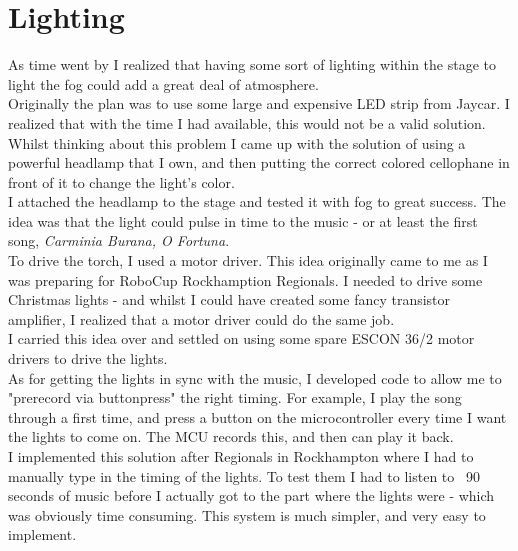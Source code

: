 		\chapter{Lighting}
			As time went by I realized that having some sort of lighting within the stage to light the fog could add a great deal of atmosphere.\\
			
			Originally the plan was to use some large and expensive LED strip from Jaycar. I realized that with the time I had available, this would not be a valid solution. Whilst thinking about this problem I came up with the solution of using a powerful headlamp that I own, and then putting the correct colored cellophane in front of it to change the light's color.\\
			
			I attached the headlamp to the stage and tested it with fog to great success. The idea was that the light could pulse in time to the music - or at least the first song, \textit{Carminia Burana, O Fortuna}.\\
			
			To drive the torch, I used a motor driver. This idea originally came to me as I was preparing for RoboCup Rockhamption Regionals. I needed to drive some Christmas lights - and whilst I could have created some fancy transistor amplifier, I realized that a  motor driver could do the same job.\\
			
			I carried this idea over and settled on using some spare ESCON 36/2 motor drivers to drive the lights.\\
			
			As for getting the lights in sync with the music, I developed code to allow me to "prerecord via buttonpress" the right timing. For example, I play the song through a first time, and press a button on the microcontroller every time I want the lights to come on. The MCU records this, and then can play it back.\\
			
			I implemented this solution after Regionals in Rockhampton where I had to manually type in the timing of the lights. To test them I had to listen to ~90 seconds of music before I actually got to the part where the lights were - which was obviously time consuming. This system is much simpler, and very easy to implement.\\